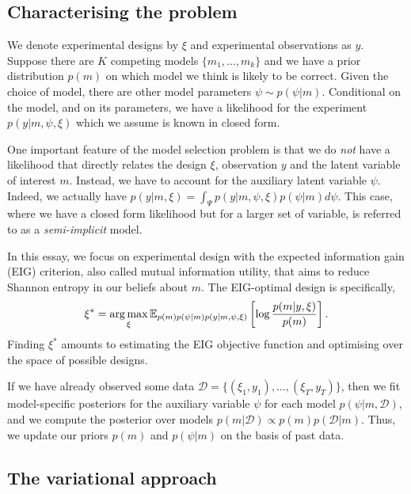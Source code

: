 \documentclass[a4paper, 10pt]{report}
\theoremstyle{plain}
\begin{document}
	\subsection{Characterising the problem}
	We denote experimental designs by $\xi$ and experimental observations as $y$.
	Suppose there are $K$ competing models $\{m_1,\dots,m_k\}$ and we have a prior distribution $p(m)$ on which model we think is likely to  be correct.
	Given the choice of model, there are other model parameters $\psi \sim p(\psi|m)$.
	Conditional on the model, and on its parameters, we have a likelihood for the experiment $p(y|m,\psi,\xi)$ which we assume is known in closed form.
	
	One important feature of the model selection problem is that we do \emph{not} have a likelihood that directly relates the design $\xi$, observation $y$ and the latent variable of interest $m$. Instead, we have to account for the auxiliary latent variable $\psi$. 
	Indeed, we actually have $p(y|m,\xi) = \int_\Psi p(y|m,\psi,\xi) p(\psi|m) d\psi$.
	This case, where we have a closed form likelihood but for a larger set of variable, is referred to as a \emph{semi-implicit} model.
	
	In this essay, we focus on experimental design with the expected information gain (EIG) criterion, also called mutual information utility, that aims to reduce Shannon entropy in our beliefs about $m$. The EIG-optimal design is specifically,
	\begin{equation}
	\xi^* = \operatorname*{arg\,max}_{\xi} \mathbb{E}_{p(m)p(\psi|m)p(y|m,\psi,\xi)}\left[ \log \frac{p(m|y,\xi)}{p(m)} \right].
	\end{equation}
	Finding $\xi^*$ amounts to estimating the EIG objective function and optimising over the space of possible designs.
	
	If we have already observed some data $\mathcal{D}=\{(\xi_1,y_1),\dots,(\xi_T,y_T)\}$, then we fit model-specific posteriors for the auxiliary variable $\psi$ for each model $p(\psi|m,\mathcal{D})$, and we compute the posterior over models $p(m|\mathcal{D}) \propto p(m)p(\mathcal{D}|m)$.
	Thus, we update our priors $p(m)$ and $p(\psi|m)$ on the basis of past data.
	
	\subsection{The variational approach}
\end{document}
